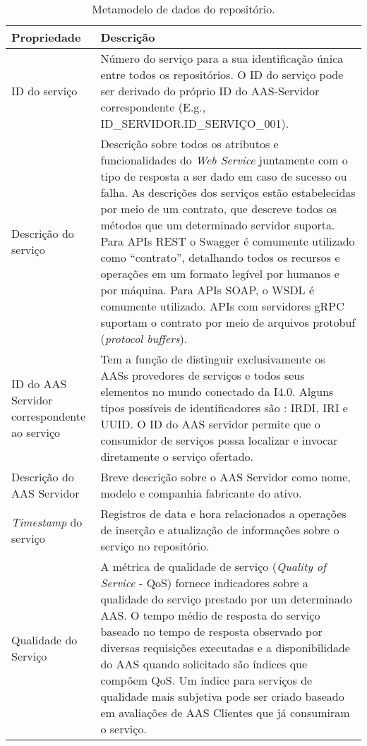 	\begin{table}[htb]
		\centering
		\label{tab:mdp-repositorio}
		\begin{tabular}{p{4cm}p{11cm}}
			\hline
			\textbf{Propriedade}
			& \textbf{Descrição} \\ 
			
			\hline
			ID do serviço
			& Número do serviço para a sua identificação única entre todos os repositórios. O ID do serviço pode ser derivado do próprio ID do AAS-Servidor correspondente (E.g., ID\_SERVIDOR.ID\_SERVIÇO\_001). \\
			
			\hline
			Descrição do serviço
			& Descrição sobre todos os atributos e funcionalidades do \textit{Web Service} juntamente com o tipo de resposta a ser dado em caso de sucesso ou falha. As descrições dos serviços estão estabelecidas por meio de um contrato, que descreve todos os métodos que um determinado servidor suporta. Para APIs REST o Swagger é comumente utilizado como ``contrato'', detalhando todos os recursos e operações em um formato legível por humanos e por máquina. Para APIs SOAP, o WSDL é comumente utilizado. APIs com servidores gRPC suportam o contrato por meio de arquivos protobuf (\textit{protocol buffers}). \\
			
			\hline
			ID do AAS Servidor correspondente ao serviço
			& Tem a função de distinguir exclusivamente os AASs provedores de serviços e todos seus elementos \cite{adolphs2016structure} no mundo conectado da I4.0. Alguns tipos possíveis de identificadores são \cite{bader2019aas}: IRDI, IRI e UUID. O ID do AAS servidor permite que o consumidor de serviços possa localizar e invocar diretamente o serviço ofertado. \\
			
			\hline
			Descrição do AAS Servidor
			& Breve descrição sobre o AAS Servidor como nome, modelo e companhia fabricante do ativo. \\	
			
			\hline
			\textit{Timestamp} do serviço
			& Registros de data e hora relacionados a operações de inserção e atualização de informações sobre o serviço no repositório. \\
			
			\hline
			Qualidade do Serviço
			& A métrica de qualidade de serviço (\textit{Quality of Service} - QoS) fornece indicadores sobre a qualidade do serviço prestado por um determinado AAS. O tempo médio de resposta do serviço baseado no tempo de resposta observado por diversas requisições executadas e a disponibilidade do AAS quando solicitado são índices que compõem QoS. Um índice para serviços de qualidade mais subjetiva pode ser criado baseado em avaliações de AAS Clientes que já consumiram o serviço.\\
			
			\hline
		\end{tabular}
		\caption{Metamodelo de dados do repositório.}
	\end{table}
	
